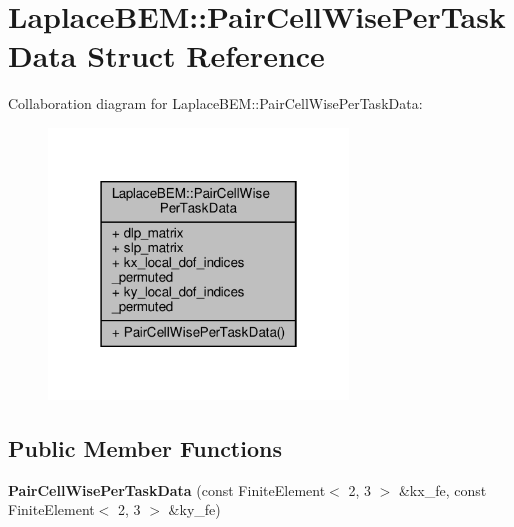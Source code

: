 \hypertarget{structLaplaceBEM_1_1PairCellWisePerTaskData}{}\section{Laplace\+B\+EM\+:\+:Pair\+Cell\+Wise\+Per\+Task\+Data Struct Reference}
\label{structLaplaceBEM_1_1PairCellWisePerTaskData}


Collaboration diagram for Laplace\+B\+EM\+:\+:Pair\+Cell\+Wise\+Per\+Task\+Data\+:\nopagebreak
\begin{figure}[H]
\begin{center}
\leavevmode
\includegraphics[width=226pt]{structLaplaceBEM_1_1PairCellWisePerTaskData__coll__graph}
\end{center}
\end{figure}
\subsection*{Public Member Functions}
\begin{DoxyCompactItemize}
\item 
\mbox{\label{structLaplaceBEM_1_1PairCellWisePerTaskData_ab181d0f788fa5fb1193b5a1559458ce5}} 
{\bfseries Pair\+Cell\+Wise\+Per\+Task\+Data} (const Finite\+Element$<$ 2, 3 $>$ \&kx\+\_\+fe, const Finite\+Element$<$ 2, 3 $>$ \&ky\+\_\+fe)
\end{DoxyCompactItemize}

